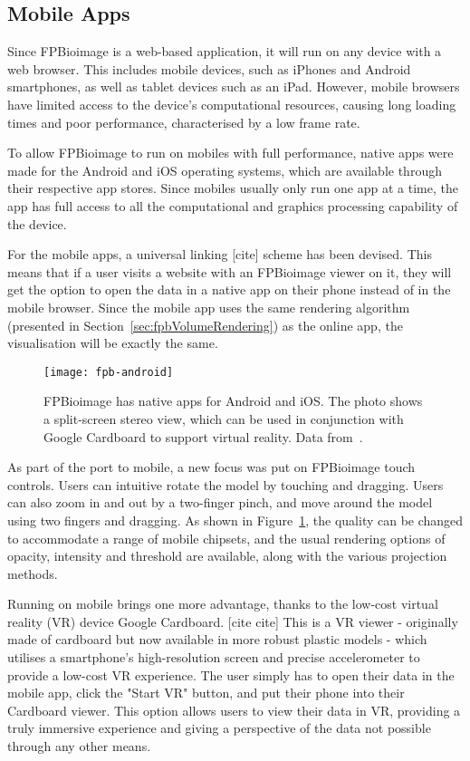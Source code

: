 \subsection{Mobile Apps}
Since FPBioimage is a web-based application, it will run on any device with a web browser. 
This includes mobile devices, such as iPhones and Android smartphones, as well as tablet devices such as an iPad. 
However, mobile browsers have limited access to the device's computational resources, causing long loading times and poor performance, characterised by a low frame rate. 

To allow FPBioimage to run on mobiles with full performance, native apps were made for the Android and iOS operating systems, which are available through their respective app stores. 
Since mobiles usually only run one app at a time, the app has full access to all the computational and graphics processing capability of the device. 

For the mobile apps, a universal linking [cite] scheme has been devised. 
This means that if a user visits a website with an FPBioimage viewer on it, they will get the option to open the data in a native app on their phone instead of in the mobile browser. 
Since the mobile app uses the same rendering algorithm (presented in Section~\ref{sec:fpbVolumeRendering}) as the online app, the visualisation will be exactly the same. 

\begin{figure}[htbp!]
\centering
\texttt{[image: fpb-android]}
\caption[FPBioimage: The FPBioimage mobile app provides volumetric rendering in virtual reality]{FPBioimage has native apps for Android and iOS. The photo shows a split-screen stereo view, which can be used in conjunction with Google Cardboard\cite{cardboard} to support virtual reality. Data from~\cite{sharpe2002optical}. } %
\label{fig:fpbMobile}
\end{figure}

As part of the port to mobile, a new focus was put on FPBioimage touch controls. 
Users can intuitive rotate the model by touching and dragging. 
Users can also zoom in and out by a two-finger pinch, and move around the model using two fingers and dragging. 
As shown in Figure~\ref{fig:fpbMobile}, the quality can be changed to accommodate a range of mobile chipsets, and the usual rendering options of opacity, intensity and threshold are available, along with the various projection methods.  

Running on mobile brings one more advantage, thanks to the low-cost virtual reality (VR) device Google Cardboard. [cite cite]
This is a VR viewer - originally made of cardboard but now available in more robust plastic models - which utilises a smartphone's high-resolution screen and precise accelerometer to provide a low-cost VR experience. 
The user simply has to open their data in the mobile app, click the "Start VR" button, and put their phone into their Cardboard viewer. 
This option allows users to view their data in VR, providing a truly immersive experience and giving a perspective of the data not possible through any other means. 

